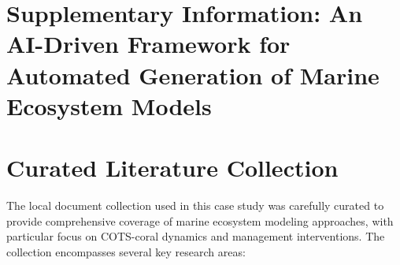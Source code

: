 \clearpage
\section*{Supplementary Information: An AI-Driven Framework for Automated Generation of Marine Ecosystem Models}

\setcounter{section}{0}
\renewcommand{\thesection}{S\arabic{section}}

\section{Curated Literature Collection}
\label{subsec:curated_literature}

The local document collection used in this case study was carefully curated to provide comprehensive coverage of marine ecosystem modeling approaches, with particular focus on COTS-coral dynamics and management interventions. The collection encompasses several key research areas:

